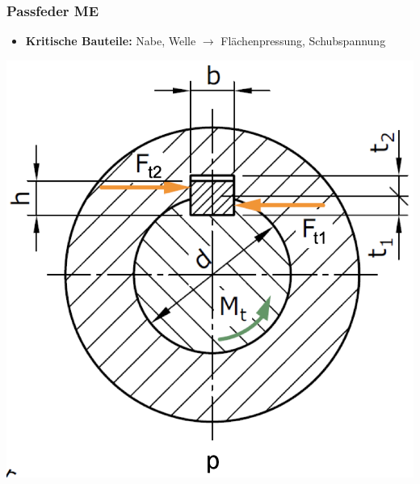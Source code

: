 \subsubsection{Passfeder \hfill ME}
\begin{scriptsize}
   \begin{itemize}
       \item \textbf{Kritische Bauteile:} Nabe, Welle $\to$ Flächenpressung, Schubspannung
   \end{itemize}
\end{scriptsize}
   \begin{minipage}{0.48\linewidth}
    \begin{center}
        \includegraphics[width = 1.0\linewidth]{src/images/MAEIP_Passfeder}
    \end{center}
   \end{minipage}
